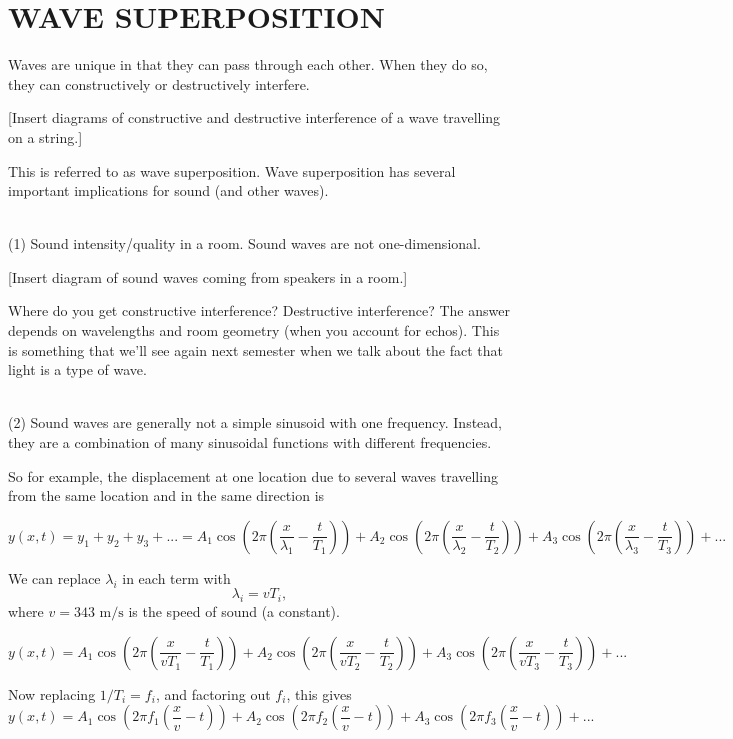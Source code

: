 \section{WAVE SUPERPOSITION}
Waves are unique in that they can pass through each other. When they do so, they can constructively or destructively interfere.

[Insert diagrams of constructive and destructive interference of a wave travelling on a string.]
\vspace{8cm}

This is referred to as wave superposition. Wave superposition has several important implications for sound (and other waves).

\hrulefill\\
(1) Sound intensity/quality in a room. Sound waves are not one-dimensional.

[Insert diagram of sound waves coming from speakers in a room.]
\vspace{5cm}

Where do you get constructive interference? Destructive interference? The answer depends on wavelengths and room geometry (when you account for echos). This is something that we'll see again next semester when we talk about the fact that light is a type of wave.

\hrulefill\\
(2) Sound waves are generally not a simple sinusoid with one frequency. Instead, they are a combination of many sinusoidal functions with different frequencies.

So for example, the displacement at one location due to several waves travelling from the same location and in the same direction is

$$y(x,t)=y_1+y_2+y_3+...=A_1\cos\left(2\pi\left(\frac{x}{\lambda_1}-\frac{t}{T_1}\right)\right) + A_2\cos\left(2\pi\left(\frac{x}{\lambda_2}-\frac{t}{T_2}\right)\right) + A_3\cos\left(2\pi\left(\frac{x}{\lambda_3}-\frac{t}{T_3}\right)\right)+...$$

We can replace $\lambda_i$ in each term with
$$\lambda_i=vT_i,$$
where $v=343\mbox{ m/s}$ is the speed of sound (a constant).

$$y(x,t)=A_1\cos\left(2\pi\left(\frac{x}{vT_1}-\frac{t}{T_1}\right)\right) + A_2\cos\left(2\pi\left(\frac{x}{vT_2}-\frac{t}{T_2}\right)\right) + A_3\cos\left(2\pi\left(\frac{x}{vT_3}-\frac{t}{T_3}\right)\right)+...$$

Now replacing $1/T_i=f_i$, and factoring out $f_i$, this gives
$$y(x,t)=A_1\cos\left(2\pi f_1\left(\frac{x}{v}-t\right)\right) + A_2\cos\left(2\pi f_2\left(\frac{x}{v}-t\right)\right) + A_3\cos\left(2\pi f_3\left(\frac{x}{v}-t\right)\right)+...$$

